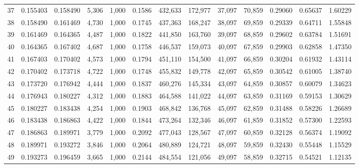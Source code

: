 \begin{tabular}{rrrrrrrrrrrrr}
37  &  0.155403 &  0.158490 &   5,306 &  1,000 &                                     0.1586 &  432,633 &  172,977 &   37,097 &   70,859 &  0.29060 &  0.65637 &  1.60229 \\
38  &  0.158490 &  0.161469 &   4,730 &  1,000 &                                     0.1745 &  437,363 &  168,247 &   38,097 &   69,859 &  0.29339 &  0.64711 &  1.55848 \\
39  &  0.161469 &  0.164365 &   4,487 &  1,000 &                                     0.1822 &  441,850 &  163,760 &   39,097 &   68,859 &  0.29602 &  0.63784 &  1.51691 \\
40  &  0.164365 &  0.167402 &   4,687 &  1,000 &                                     0.1758 &  446,537 &  159,073 &   40,097 &   67,859 &  0.29903 &  0.62858 &  1.47350 \\
41  &  0.167403 &  0.170402 &   4,573 &  1,000 &                                     0.1794 &  451,110 &  154,500 &   41,097 &   66,859 &  0.30204 &  0.61932 &  1.43114 \\
42  &  0.170402 &  0.173718 &   4,722 &  1,000 &                                     0.1748 &  455,832 &  149,778 &   42,097 &   65,859 &  0.30542 &  0.61005 &  1.38740 \\
43  &  0.173720 &  0.176942 &   4,444 &  1,000 &                                     0.1837 &  460,276 &  145,334 &   43,097 &   64,859 &  0.30857 &  0.60079 &  1.34623 \\
44  &  0.176943 &  0.180227 &   4,312 &  1,000 &                                     0.1883 &  464,588 &  141,022 &   44,097 &   63,859 &  0.31169 &  0.59153 &  1.30629 \\
45  &  0.180227 &  0.183438 &   4,254 &  1,000 &                                     0.1903 &  468,842 &  136,768 &   45,097 &   62,859 &  0.31488 &  0.58226 &  1.26689 \\
46  &  0.183438 &  0.186863 &   4,422 &  1,000 &                                     0.1844 &  473,264 &  132,346 &   46,097 &   61,859 &  0.31852 &  0.57300 &  1.22593 \\
47  &  0.186863 &  0.189971 &   3,779 &  1,000 &                                     0.2092 &  477,043 &  128,567 &   47,097 &   60,859 &  0.32128 &  0.56374 &  1.19092 \\
48  &  0.189971 &  0.193272 &   3,846 &  1,000 &                                     0.2064 &  480,889 &  124,721 &   48,097 &   59,859 &  0.32430 &  0.55448 &  1.15529 \\
49  &  0.193273 &  0.196459 &   3,665 &  1,000 &                                     0.2144 &  484,554 &  121,056 &   49,097 &   58,859 &  0.32715 &  0.54521 &  1.12135 \\

\end{tabular}
